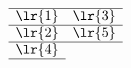 \[
\begin{array}[c]{*{2}c}\cline{1-2}
\lr{1}&\lr{3}\\\cline{1-2}
\lr{2}&\lr{5}\\\cline{1-2}
\lr{4}\\\cline{1-1}
\end{array}

\]